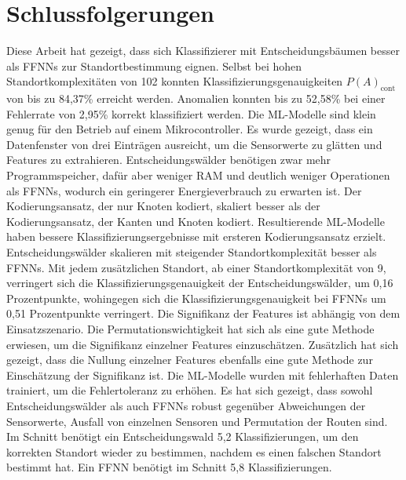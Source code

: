 \chapter{Schlussfolgerungen}
Diese Arbeit hat gezeigt, dass sich Klassifizierer mit Entscheidungsbäumen besser als FFNNs zur Standortbestimmung eignen.
Selbst bei hohen Standortkomplexitäten von 102 konnten Klassifizierungsgenauigkeiten $P(A)_{\text{cont}}$ von bis zu 84,37\% erreicht werden.
Anomalien konnten bis zu 52,58\% bei einer Fehlerrate von 2,95\% korrekt klassifiziert werden.
\newline
\newline
Die ML-Modelle sind klein genug für den Betrieb auf einem Mikrocontroller.
Es wurde gezeigt, dass ein Datenfenster von drei Einträgen ausreicht, um die Sensorwerte zu glätten und Features zu extrahieren.
Entscheidungswälder benötigen zwar mehr Programmspeicher, dafür aber weniger RAM und deutlich weniger Operationen als FFNNs, wodurch
ein geringerer Energieverbrauch zu erwarten ist.
\newline
\newline
Der Kodierungsansatz, der nur Knoten kodiert, skaliert besser als der Kodierungsansatz, der Kanten und Knoten kodiert.
Resultierende ML-Modelle haben bessere Klassifizierungsergebnisse mit ersteren Kodierungsansatz erzielt.
Entscheidungswälder skalieren mit steigender Standortkomplexität besser als FFNNs.
Mit jedem zusätzlichen Standort, ab einer Standortkomplexität von 9, verringert sich die Klassifizierungsgenauigkeit der Entscheidungswälder,
um 0,16 Prozentpunkte, wohingegen sich die Klassifizierungsgenauigkeit bei FFNNs um 0,51 Prozentpunkte verringert.
\newline
\newline
Die Signifikanz der Features ist abhängig von dem Einsatzszenario.
Die Permutationswichtigkeit hat sich als eine gute Methode erwiesen, um die Signifikanz einzelner Features einzuschätzen.
Zusätzlich hat sich gezeigt, dass die Nullung einzelner Features ebenfalls eine gute Methode zur Einschätzung der Signifikanz ist.
\newpage
Die ML-Modelle wurden mit fehlerhaften Daten trainiert, um die Fehlertoleranz zu erhöhen.
Es hat sich gezeigt, dass sowohl Entscheidungswälder als auch FFNNs robust gegenüber Abweichungen der Sensorwerte,
Ausfall von einzelnen Sensoren und Permutation der Routen sind.
Im Schnitt benötigt ein Entscheidungswald 5,2 Klassifizierungen, um den korrekten Standort wieder zu bestimmen,
nachdem es einen falschen Standort bestimmt hat.
Ein FFNN benötigt im Schnitt 5,8 Klassifizierungen.
